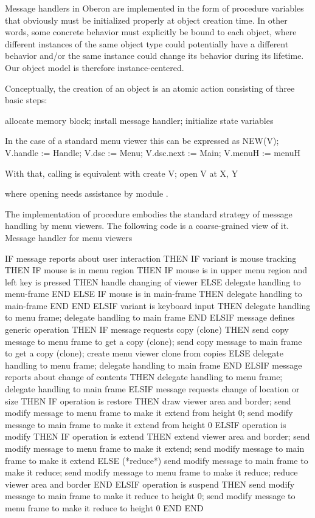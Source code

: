 Message handlers in Oberon are implemented in the form of procedure
variables that obviously must be initialized properly at object
creation time. In other words, some concrete behavior must explicitly
be bound to each object, where different instances of the same object
type could potentially have a different behavior and/or the same
instance could change its behavior during its lifetime. Our object
model is therefore instance-centered.

Conceptually, the creation of an object is an atomic action consisting
of three basic steps:

allocate memory block; install message handler; initialize state variables

\noindent In the case of a standard menu viewer  this can be expressed as
\begintt
NEW(V);
V.handle := Handle;
V.dsc := Menu;
V.dsc.next := Main;
V.menuH := menuH
\endtt

\noindent With that, calling  is equivalent with
\begintt
create V; open V at X, Y
\endtt

\noindent where opening  needs assistance by module .

The implementation of procedure  embodies the standard strategy of message handling by
menu viewers. The following code is a coarse-grained view of it.
\begintt
Message handler for menu viewers

IF message reports about user interaction THEN
  IF variant is mouse tracking THEN
    IF mouse is in menu region THEN
      IF mouse is in upper menu region and left key is pressed THEN
        handle changing of viewer
      ELSE delegate handling to menu-frame
      END
    ELSE
      IF mouse is in main-frame THEN delegate handling to main-frame END
    END
  ELSIF variant is keyboard input THEN
    delegate handling to menu frame;
    delegate handling to main frame
  END
ELSIF message defines generic operation THEN
  IF message requests copy (clone) THEN
    send copy message to menu frame to get a copy (clone);
    send copy message to main frame to get a copy (clone);
    create menu viewer clone from copies
  ELSE
    delegate handling to menu frame; delegate handling to main frame
  END
ELSIF message reports about change of contents THEN
  delegate handling to menu frame;
  delegate handling to main frame
ELSIF message requests change of location or size THEN
  IF operation is restore THEN
    draw viewer area and border;
    send modify message to menu frame to make it extend from height 0;
    send modify message to main frame to make it extend from height 0
  ELSIF operation is modify THEN
    IF operation is extend THEN
      extend viewer area and border;
      send modify message to menu frame to make it extend;
      send modify message to main frame to make it extend
    ELSE (*reduce*)
      send modify message to main frame to make it reduce;
      send modify message to menu frame to make it reduce;
      reduce viewer area and border
    END
  ELSIF operation is suspend THEN
    send modify message to main frame to make it reduce to height 0;
    send modify message to menu frame to make it reduce to height 0
  END
END
\endtt

